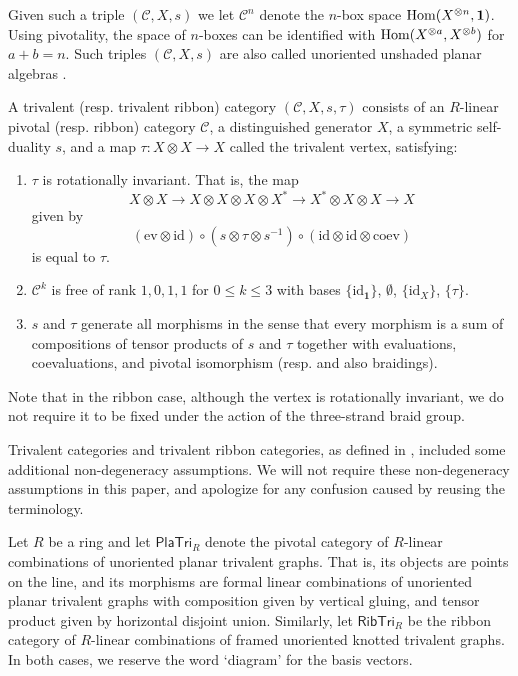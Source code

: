 \documentclass[12pt]{amsart}
\begin{document}
Given such a triple $(\mathcal{C}, X, s)$ we let $\mathcal{C}^n$ denote the $n$-box space $\operatorname{Hom}(X^{\otimes n},\mathbf{1})$. Using pivotality, the space of $n$-boxes can be identified with $\operatorname{Hom}(X^{\otimes a},X^{\otimes b})$ for $a+b = n$. Such triples $(\mathcal{C}, X, s)$ are also called unoriented unshaded planar algebras \cite{MR2559686,1507.06030,MR3624901}.

\begin{definition}
    A trivalent (resp. trivalent ribbon) category $(\mathcal{C},X,s,\tau)$ consists of an $R$-linear pivotal (resp. ribbon) category $\mathcal{C}$, a distinguished generator $X$, a symmetric self-duality $s$, and a map $\tau\colon X \otimes X \rightarrow X$ called the trivalent vertex, satisfying:
    \begin{enumerate}
        \item $\tau$ is rotationally invariant. That is, the map $$X \otimes X \rightarrow X \otimes X \otimes X \otimes X^* \rightarrow X^* \otimes X \otimes X \rightarrow X$$ given by \[(\mathrm{ev} \otimes \mathrm{id}) \circ (s \otimes \tau \otimes s^{-1}) \circ (\mathrm{id} \otimes \mathrm{id} \otimes \mathrm{coev})\] is equal to $\tau$.
        \item $\mathcal{C}^k$ is free of rank $1,0,1,1$ for $0 \leq k \leq 3$ with bases $\{\mathrm{id}_{\mathbf{1}}\}$, $\emptyset$, $\{\mathrm{id}_X\}$, $\{\tau\}$.
        \item $s$ and $\tau$ generate all morphisms in the sense that every morphism is a sum of compositions of tensor products of $s$ and $\tau$ together with evaluations, coevaluations, and pivotal isomorphism (resp. and also braidings).
    \end{enumerate}
\end{definition}

Note that in the ribbon case, although the vertex is rotationally invariant, we do not require it to be fixed under the action of the three-strand braid group.

\begin{remark}
    Trivalent categories and trivalent ribbon categories, as defined in  \cite{MR3624901, MR5101335}, included some additional non-degeneracy assumptions. We will not require these non-degeneracy assumptions in this paper, and apologize for any confusion caused by reusing the terminology.
\end{remark}

 
Let $R$ be a ring and let $\mathsf{PlaTri}_R$ denote the pivotal category of $R$-linear combinations of unoriented planar trivalent graphs. That is, its objects are points on the line, and its morphisms are formal linear combinations of unoriented planar trivalent graphs with composition given by vertical gluing, and tensor product given by horizontal disjoint union. Similarly, let $\mathsf{RibTri}_R$ be the ribbon category of $R$-linear combinations of framed unoriented knotted trivalent graphs. In both cases, we reserve the word `diagram' for the basis vectors.
\end{document}
